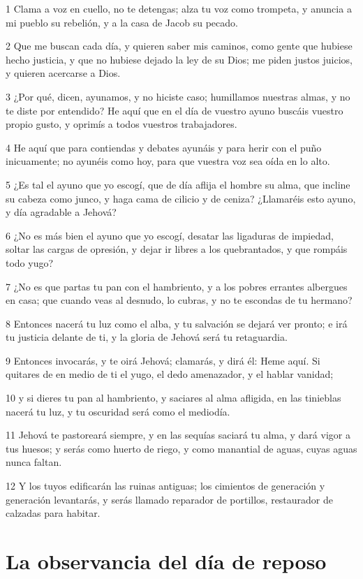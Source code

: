 \par 1 Clama a voz en cuello, no te detengas; alza tu voz como trompeta, y anuncia a mi pueblo su rebelión, y a la casa de Jacob su pecado.
\par 2 Que me buscan cada día, y quieren saber mis caminos, como gente que hubiese hecho justicia, y que no hubiese dejado la ley de su Dios; me piden justos juicios, y quieren acercarse a Dios.
\par 3 ¿Por qué, dicen, ayunamos, y no hiciste caso; humillamos nuestras almas, y no te diste por entendido? He aquí que en el día de vuestro ayuno buscáis vuestro propio gusto, y oprimís a todos vuestros trabajadores.
\par 4 He aquí que para contiendas y debates ayunáis y para herir con el puño inicuamente; no ayunéis como hoy, para que vuestra voz sea oída en lo alto.
\par 5 ¿Es tal el ayuno que yo escogí, que de día aflija el hombre su alma, que incline su cabeza como junco, y haga cama de cilicio y de ceniza? ¿Llamaréis esto ayuno, y día agradable a Jehová?
\par 6 ¿No es más bien el ayuno que yo escogí, desatar las ligaduras de impiedad, soltar las cargas de opresión, y dejar ir libres a los quebrantados, y que rompáis todo yugo?
\par 7 ¿No es que partas tu pan con el hambriento, y a los pobres errantes albergues en casa; que cuando veas al desnudo, lo cubras, y no te escondas de tu hermano?
\par 8 Entonces nacerá tu luz como el alba, y tu salvación se dejará ver pronto; e irá tu justicia delante de ti, y la gloria de Jehová será tu retaguardia.
\par 9 Entonces invocarás, y te oirá Jehová; clamarás, y dirá él: Heme aquí. Si quitares de en medio de ti el yugo, el dedo amenazador, y el hablar vanidad;
\par 10 y si dieres tu pan al hambriento, y saciares al alma afligida, en las tinieblas nacerá tu luz, y tu oscuridad será como el mediodía.
\par 11 Jehová te pastoreará siempre, y en las sequías saciará tu alma, y dará vigor a tus huesos; y serás como huerto de riego, y como manantial de aguas, cuyas aguas nunca faltan.
\par 12 Y los tuyos edificarán las ruinas antiguas; los cimientos de generación y generación levantarás, y serás llamado reparador de portillos, restaurador de calzadas para habitar.

\section*{La observancia del día de reposo}

